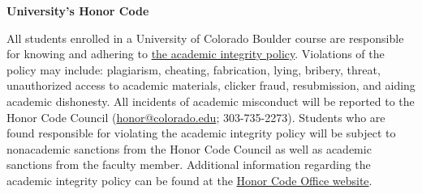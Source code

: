 \documentclass[11pt]{article}
\begin{document}
\bigskip
\textbf{\normalsize University's Honor Code}

All students enrolled in a University of Colorado Boulder course are responsible for knowing and adhering to \href{http://www.colorado.edu/policies/academic-integrity-policy}{the academic integrity policy}. Violations of the policy may include: plagiarism, cheating, fabrication, lying, bribery, threat, unauthorized access to academic materials, clicker fraud, resubmission, and aiding academic dishonesty. All incidents of academic misconduct will be reported to the Honor Code Council (\href{mailto:honor@colorado.edu}{honor@colorado.edu}; 303-735-2273). Students who are found responsible for violating the academic integrity policy will be subject to nonacademic sanctions from the Honor Code Council as well as academic sanctions from the faculty member. Additional information regarding the academic integrity policy can be found at the \href{http://www.colorado.edu/honorcode/}{Honor Code Office website}.

\newcommand{\lect}[2]
{\parbox[t]{2.0in}{\textbf{#1:} \\ \hspace*{0.25in} \parbox[t]{2.5in}{\footnotesize{ #2}} \\ }}

\newpage
\end{document}
